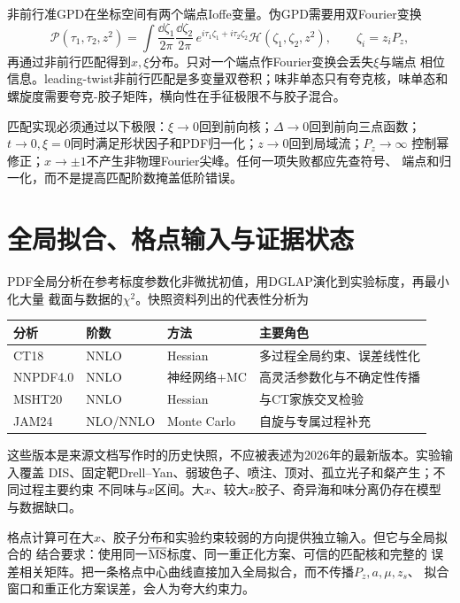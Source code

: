 非前行准GPD在坐标空间有两个端点Ioffe变量。伪GPD需要用双Fourier变换
\begin{equation}
  \mathcal P(\tau_1,\tau_2,z^2)
  =\int\frac{\dd\zeta_1}{2\pi}\frac{\dd\zeta_2}{2\pi}\,
  e^{i\tau_1\zeta_1+i\tau_2\zeta_2}
  \mathcal H(\zeta_1,\zeta_2,z^2),
  \qquad \zeta_i=z_iP_z,
  \label{eq:b04-pseudo-gpd}
\end{equation}
再通过非前行匹配得到$x,\xi$分布。只对一个端点作Fourier变换会丢失$\xi$与端点
相位信息。leading-twist非前行匹配是多变量双卷积；味非单态只有夸克核，味单态和
螺旋度需要夸克-胶子矩阵，横向性在手征极限不与胶子混合。

匹配实现必须通过以下极限：$\xi\to0$回到前向核；$\Delta\to0$回到前向三点函数；
$t\to0,\xi=0$同时满足形状因子和PDF归一化；$z\to0$回到局域流；$P_z\to\infty$
控制幂修正；$x\to\pm1$不产生非物理Fourier尖峰。任何一项失败都应先查符号、
端点和归一化，而不是提高匹配阶数掩盖低阶错误。

\section{全局拟合、格点输入与证据状态}

PDF全局分析在参考标度参数化非微扰初值，用DGLAP演化到实验标度，再最小化大量
截面与数据的$\chi^2$。快照资料列出的代表性分析为
\begin{center}
  \small
  \begin{tabularx}{0.95\textwidth}{@{}l l l X@{}}
    \toprule
    分析 & 阶数 & 方法 & 主要角色 \\
    \midrule
    CT18 & NNLO & Hessian & 多过程全局约束、误差线性化 \\
    NNPDF4.0 & NNLO & 神经网络+MC & 高灵活参数化与不确定性传播 \\
    MSHT20 & NNLO & Hessian & 与CT家族交叉检验 \\
    JAM24 & NLO/NNLO & Monte Carlo & 自旋与专属过程补充 \\
    \bottomrule
  \end{tabularx}
\end{center}
这些版本是来源文档写作时的历史快照，不应被表述为2026年的最新版本。实验输入覆盖
DIS、固定靶Drell--Yan、弱玻色子、喷注、顶对、孤立光子和粲产生；不同过程主要约束
不同味与$x$区间。大$x$、较大$x$胶子、奇异海和味分离仍存在模型与数据缺口。

格点计算可在大$x$、胶子分布和实验约束较弱的方向提供独立输入。但它与全局拟合的
结合要求：使用同一$\overline{\rm MS}$标度、同一重正化方案、可信的匹配核和完整的
误差相关矩阵。把一条格点中心曲线直接加入全局拟合，而不传播$P_z,a,\mu,z_s$、
拟合窗口和重正化方案误差，会人为夸大约束力。

